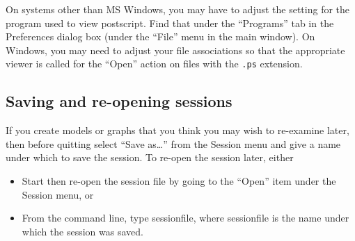 On systems other than MS Windows, you may have to adjust the setting
for the program used to view postscript.  Find that under the
``Programs'' tab in the Preferences dialog box (under the ``File''
menu in the main window).  On Windows, you may need to adjust your
file associations so that the appropriate viewer is called for the
``Open'' action on files with the \verb+.ps+ extension.

\subsection{Saving and re-opening sessions}
\label{session-save}

If you create models or graphs that you think you may wish to
re-examine later, then before quitting  select ``Save
as\dots{}'' from the Session menu and give a name under which to save
the session.  To re-open the session later, either

\begin{itemize}
\item Start  then re-open the session file by going to the
  ``Open'' item under the Session menu, or
\item From the command line, type  sessionfile, where
  sessionfile is the name under which the session was saved.
\end{itemize}



